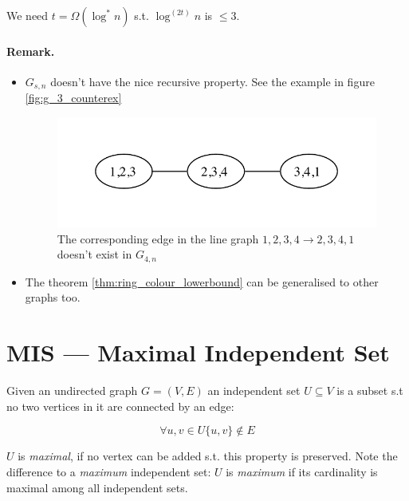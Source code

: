 \begin{pr} We need $t=\Omega(\log^* n)$ s.t. $\log^{(2t)} n$ is $\leq 3$.\end{pr}

\paragraph{Remark.}

\begin{itemize} 
\item$G_{s,n}$ doesn't have the nice recursive property. See the example in figure \ref{fig:g_3_counterex}

\begin{figure}[hbt]
\begin{center}
\includegraphics{./images/g_3_counterex}
\end{center}
\caption{The corresponding edge in the line graph $1,2,3,4 \rightarrow 2,3,4,1$ doesn't exist in $G_{4,n}$}
\end{figure}

%
%
%
\item The theorem \ref{thm:ring_colour_lowerbound} can be generalised to other graphs too.
\end{itemize}

\section{MIS --- Maximal Independent Set}

\begin{Def} Given an undirected graph $G=(V,E)$ an independent set $U\subseteq V$ is a subset s.t no two vertices in it are connected by an edge:

\[\forall u,v \in U \{u,v\}\not \in E\]

$U$ is \emph{maximal}, if no vertex can be added s.t. this property is preserved. Note the difference to a \emph{maximum} independent set: $U$ is \emph{maximum} if its cardinality is maximal among all independent sets.
\end{Def}

